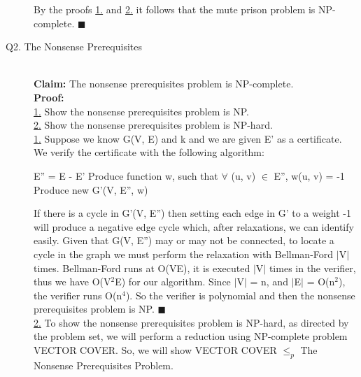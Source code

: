 \documentclass[10pt]{csc_assignment}
\begin{document}
\begin{description}
By the proofs \underline{1.} and \underline{2.} it follows that the mute prison problem is NP-complete. $\blacksquare$\\


\newpage
\item[Q2. The Nonsense Prerequisites]

~\\
\textbf{Claim:} The nonsense prerequisites problem is NP-complete.\\
\textbf{Proof:}\\
\underline{1.} Show the nonsense prerequisites problem is NP.\\
\underline{2.} Show the nonsense prerequisites problem is NP-hard.\\

\underline{1.} Suppose we know G(V, E) and k and we are given E' as a certificate. We verify the certificate with the following algorithm:\\
\begin{algorithm}[H]
 \LinesNumbered 
E'' = E - E'\;
Produce function w, such that $\forall$ (u, v) $\in$ E'', w(u, v) = -1\;
Produce new G'(V, E'', w)\;
\end{algorithm}
If there is a cycle in G'(V, E'') then setting each edge in G' to a weight -1 will produce a negative edge cycle which, after relaxations, we can identify easily. Given that G(V, E'') may or may not be connected, to locate a cycle in the graph we must perform the relaxation with Bellman-Ford $\mid$V$\mid$ times. Bellman-Ford runs at O(VE), it is executed $\mid$V$\mid$ times in the verifier, thus we have O(V$^2$E) for our algorithm. Since $\mid$V$\mid$ = n, and $\mid$E$\mid$ = O(n$^2$), the verifier runs O(n$^4$). So the verifier is polynomial and then the nonsense prerequisites problem is NP. $\blacksquare$\\ 

\underline{2.} To show the nonsense prerequisites problem is NP-hard, as directed by the problem set, we will perform a reduction using NP-complete problem VECTOR COVER. So, we will show VECTOR COVER $\leqslant_{p}$ The Nonsense Prerequisites Problem.\\


\end{description}
\end{document}
